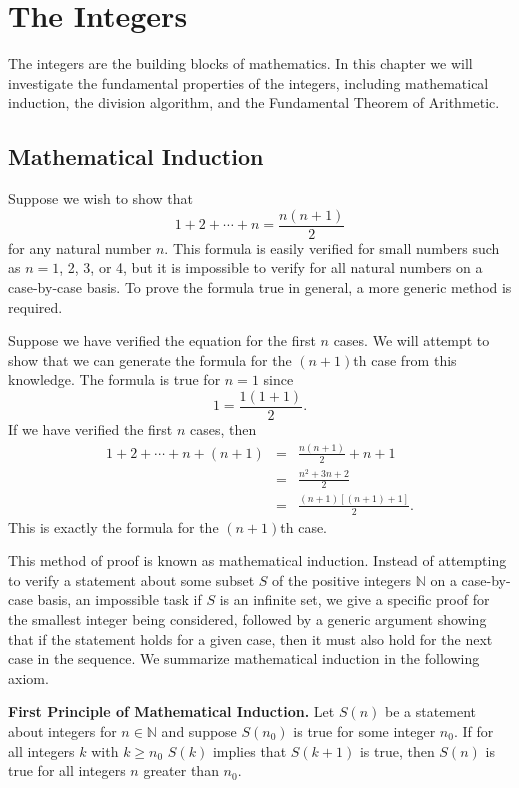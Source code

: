\chapter{The Integers}\label{integers}
 
 
The integers are the building blocks of mathematics. In this chapter we will investigate  the fundamental properties of the integers, including mathematical induction, the division algorithm, and the Fundamental Theorem of Arithmetic.
 

\section{Mathematical Induction}\label{integers_section_1}

Suppose we wish to show that
$$
1 + 2 + \cdots + n = \frac{n(n + 1)}{2}
$$
for any natural number $n$. This formula is easily  verified for small numbers such as $n = 1$, 2, 3, or 4, but it is impossible to verify for all natural numbers on a case-by-case basis.  To prove the formula true in general, a more generic method is required.

Suppose we have verified the equation for the first $n$ cases.  We will attempt to show that we can generate the formula for the $(n + 1)$th case from this knowledge.  The formula is true for $n = 1$ since 
$$
1 = \frac{1(1 + 1)}{2}.
$$
If we have verified the first $n$ cases, then
\begin{eqnarray*}
1 + 2 + \cdots + n + (n + 1) & = & \frac{n(n + 1)}{2} + n + 1 \\
& = & \frac{n^2 + 3n + 2}{2} \\
& = & \frac{(n + 1)[(n + 1) + 1]}{2}.
\end{eqnarray*}
This is exactly the formula for the $(n + 1)$th case.
 
This method of proof is known as {\bfi mathematical induction}.  Instead of attempting to verify a statement about some subset $S$ of the positive integers ${\mathbb N}$ on a case-by-case basis, an impossible task if $S$ is an infinite set, we give a specific proof for the smallest integer being considered, followed by a generic argument showing that if the statement holds for a given case, then it must also hold for the next  case in the sequence.  We summarize mathematical induction in the following axiom. 

\medskip

\noindent
{\bf First Principle of Mathematical Induction.} 
Let $S(n)$ be a statement about integers for  $n \in {\mathbb N}$ and suppose $S(n_0)$ is true for some integer $n_0$.  If for all integers $k$ with $k \geq n_0$ $S(k)$ implies that $S(k+1)$ is true, then $S(n)$ is true for all integers $n$ greater than $n_0$.  

